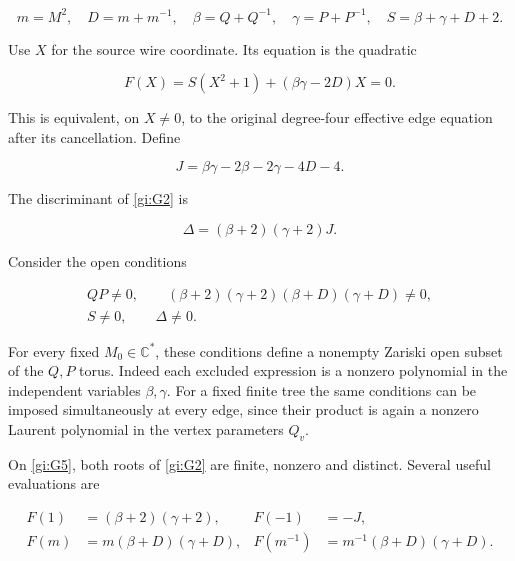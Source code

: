 \begin{equation}\label{gi:G1}
m=M^2,\quad D=m+m^{-1},\quad
 \beta=Q+Q^{-1},\quad\gamma=P+P^{-1},\quad
 S=\beta+\gamma+D+2.
\end{equation}

Use \(X\) for the source wire coordinate. Its equation is the
quadratic

\begin{equation}\label{gi:G2}
F(X)=S(X^2+1)+(\beta\gamma-2D)X=0.
\end{equation}

This is equivalent, on \(X\ne0\), to the original degree-four
effective edge equation after its cancellation. Define

\begin{equation}\label{gi:G3}
J=\beta\gamma-2\beta-2\gamma-4D-4.
\end{equation}

The discriminant of \eqref{gi:G2} is

\begin{equation}\label{gi:G4}
\Delta=(\beta+2)(\gamma+2)J.
\end{equation}

Consider the open conditions

\begin{equation}\label{gi:G5}
\begin{gathered}
 QP\ne0,\qquad
 (\beta+2)(\gamma+2)(\beta+D)(\gamma+D)\ne0,\\
 S\ne0,\qquad \Delta\ne0.
\end{gathered}
\end{equation}

For every fixed \(M_0\in\mathbb C^*\), these conditions define
a nonempty Zariski open subset of the \(Q,P\) torus. Indeed each
excluded expression is a nonzero polynomial in the independent
variables \(\beta,\gamma\). For a fixed finite tree the same
conditions can be imposed simultaneously at every edge, since
their product is again a nonzero Laurent polynomial in the
vertex parameters \(Q_v\).

On \eqref{gi:G5}, both roots of \eqref{gi:G2} are finite, nonzero and distinct.
Several useful evaluations are

\begin{equation}\label{gi:G6}
\begin{aligned}
 F(1)&=(\beta+2)(\gamma+2),&
 F(-1)&=-J,\\
 F(m)&=m(\beta+D)(\gamma+D),&
 F(m^{-1})&=m^{-1}(\beta+D)(\gamma+D).
\end{aligned}
\end{equation}

